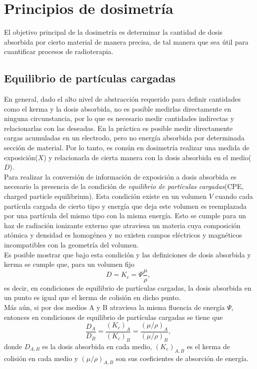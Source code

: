 \section{Principios de dosimetría}
El objetivo principal de la dosimetría es determinar la cantidad de dosis absorbida por cierto material de manera precisa, de tal manera que sea útil para cuantificar procesos de radioterapia.
\subsection{Equilibrio de partículas cargadas}
En general, dado el alto nivel de abstracción requerido para definir cantidades como el kerma y la dosis absorbida, no es posible medirlas directamente en ninguna circunstancia, por lo que es necesario medir cantidades indirectas y relacionarlas con las deseadas. En la práctica es posible medir directamente cargas acumuladas en un electrodo, pero no energía absorbida por determinada sección de material. Por lo tanto, es común en dosimetría realizar una medida de exposición($X$) y relacionarla de cierta manera con la dosis absorbida en el medio($D$).\\

Para realizar la conversión de información de exposición a dosis absorbida es necesario la presencia de la condición de \textit{equilibrio de partículas cargadas}(CPE, charged particle equilibrium). Esta condición existe en un volumen $V$ cuando cada partícula cargada de cierto tipo y energía que deja este volumen es reemplazada por una partícula del mismo tipo con la misma energía.  Esto se cumple para un haz de radiación ionizante externo que atraviesa un materia cuya composición atómica y densidad es homogénea y no existen campos eléctricos y magnéticos incompatibles con la geometría del volumen.\\

Es posible mostrar \cite{Attix1986} que bajo esta condición y las definiciones de dosis absorbida y kerma se cumple que, para un volumen fijo 
\begin{equation}
	D=K_c=\Psi \frac{\mu }{\rho},
\end{equation}
es decir, en condiciones de equilibrio de partículas cargadas, la dosis absorbida en un punto es igual que el kerma de colisión en dicho punto.\\

Más aún, si por dos medios A y B atraviesa la misma fluencia de energía $\Psi$, entonces en condiciones de equilibrio de partículas cargadas se tiene que 
\begin{equation}
	\frac{D_A}{D_B}=\frac{(K_c)_A}{(K_c)_B}=\frac{(\mu/\rho)_A}{(\mu/\rho)_B},
\end{equation}
donde $D_{A,B}$ es la dosis absorbida en cada medio, $(K_c)_{A,B}$ es el kerma de colisión en cada medio y $(\mu/\rho)_{A,B}$ son sus coeficientes de absorción de energía.\\

